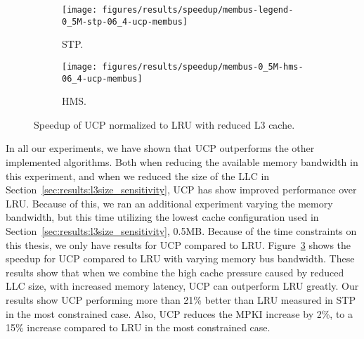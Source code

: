 \begin{figure}[t]
    \centering
        \begin{subfigure}[b]{0.5\textwidth}
            \texttt{[image: figures/results/speedup/membus-legend-0\_5M-stp-06\_4-ucp-membus]}
            \caption{STP.}
            \label{fig:results:bus-05:ucp:stp}
        \end{subfigure}%
        \begin{subfigure}[b]{0.5\textwidth}
            \texttt{[image: figures/results/speedup/membus-0\_5M-hms-06\_4-ucp-membus]}
            \caption{HMS.}
            \label{fig:results:bus-05:ucp:hms}
        \end{subfigure}
        \caption{Speedup of UCP normalized to LRU with reduced L3 cache.}
        \label{fig:results:bus-05:ucp}
\end{figure}


In all our experiments, we have shown that UCP outperforms the other implemented algorithms.
Both when reducing the available memory bandwidth in this experiment, and when we reduced the size of the LLC in Section~\ref{sec:results:l3size_sensitivity}, UCP has show improved performance over LRU.
Because of this, we ran an additional experiment varying the memory bandwidth, but this time utilizing the lowest cache configuration used in Section~\ref{sec:results:l3size_sensitivity}, 0.5MB.
Because of the time constraints on this thesis, we only have results for UCP compared to LRU.
Figure~\ref{fig:results:bus-05:ucp} shows the speedup for UCP compared to LRU with varying memory bus bandwidth.
These results show that when we combine the high cache pressure caused by reduced LLC size, with increased memory latency, UCP can outperform LRU greatly.
Our results show UCP performing more than 21\% better than LRU measured in STP in the most constrained case.
Also, UCP reduces the MPKI increase by 2\%, to a 15\% increase compared to LRU in the most constrained case.
